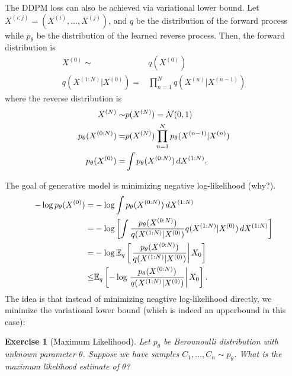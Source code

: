 \documentclass[11pt]{article}
\newtheorem{exercise}{Exercise}
\begin{document}
The DDPM loss can also be achieved via variational lower bound.
Let $X^{(i:j)} = (X^{(i)}, \dots, X^{(j)})$, and $q$ be the distribution of the forward process while $p_{\theta}$ be the distribution of the learned reverse process.
Then, the forward distribution is 
\begin{align}
    X^{(0)} \sim& q(X^{(0)})\\
    q(X^{(1:N)}|X^{(0)}) =& \prod_{n=1}^N q(X^{(n)}|X^{(n-1)})
\end{align}
where the reverse distribution is
\begin{align}
    X^{(N)}\sim& p(X^{(N)})={\cal N}(0, 1)\\
    p_{\theta} (X^{(0:N)}) =& p(X^{(N)}) \prod_{n=1}^N p_{\theta}(X^{(n-1)}|X^{(n)})\\
    p_{\theta}(X^{(0)}) =& \int p_{\theta}(X^{(0:N)})\, dX^{(1:N)}.
\end{align}

The goal of generative model is minimizing negative log-likelihood (why?).
\begin{align}
    -\log p_{\theta}(X^{(0)}) =& -\log \int p_{\theta}(X^{(0:N)})\, dX^{(1:N)}\\
    =& -\log \left[\int \frac{p_{\theta}(X^{(0:N)})}{q(X^{(1:N)}|X^{(0)})} q(X^{(1:N)}|X^{(0)})\, dX^{(1:N)}\right]\\
    =& -\log \mathbb{E}_q\left[\left.\frac{p_{\theta}(X^{(0:N)})}{q(X^{(1:N)}|X^{(0)})} \right|X_0\right]\\
    \leq& \mathbb{E}_q\left[-\log \left.\frac{p_{\theta}(X^{(0:N)})}{q(X^{(1:N)}|X^{(0)})} \right|X_0\right].
\end{align}
The idea is that instead of minimizing neagtive log-likelihood directly,
we minimize the variational lower bound (which is indeed an upperbound in this case):

\begin{exercise}[Maximum Likelihood]
    Let $p_{\theta}$ be Berounoulli distribution with unknown parameter $\theta$.
    Suppose we have samples $C_1, \dots, C_n\sim p_{\theta}$.
    What is the maximum likelihood estimate of $\theta$?
\end{exercise}
\end{document}
